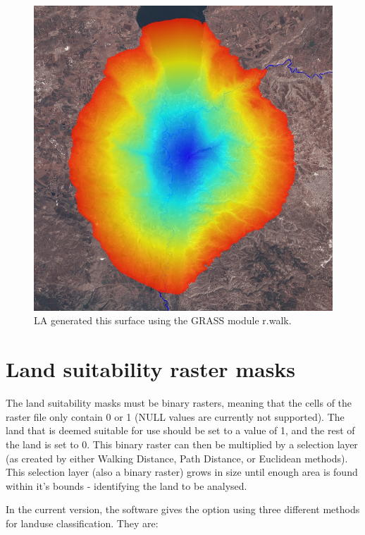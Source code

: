 \begin{figure}[htbp] \centering
\includegraphics[scale=0.29]{./images/rwalkShuna.jpg}
   \caption{LA generated this surface using the GRASS module r.walk.}
   \label{fig:rwalk} \end{figure}

\section{Land suitability raster masks} 

The land suitability masks must be binary rasters, meaning that the cells of
the raster file only contain 0 or 1 (NULL values are currently not supported).
The land that is deemed suitable for use should be set to a value of 1, and the
rest of the land is set to 0.  This binary raster  can then be multiplied by a
selection layer (as created by either Walking Distance, Path Distance,
or Euclidean methods).  This selection layer (also a binary raster) grows in
size until enough area is
found within it's bounds - identifying the land to be analysed.

In the current version, the software gives the option using three different
methods for landuse classification.  They are: 

